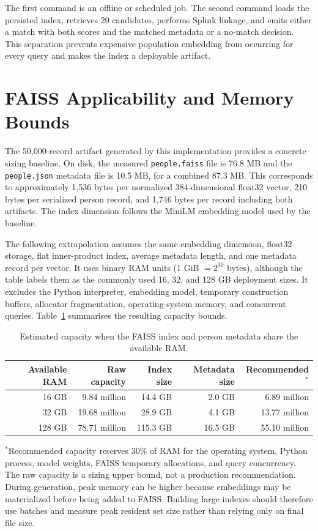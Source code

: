 \documentclass[conference]{IEEEtran}
\begin{document}
The first command is an offline or scheduled job. The second command loads the persisted index, retrieves 20 candidates, performs Splink linkage, and emits either a match with both scores and the matched metadata or a no-match decision. This separation prevents expensive population embedding from occurring for every query and makes the index a deployable artifact.

\section{FAISS Applicability and Memory Bounds}
The 50,000-record artifact generated by this implementation provides a concrete sizing baseline. On disk, the measured \texttt{people.faiss} file is 76.8 MB and the \texttt{people.json} metadata file is 10.5 MB, for a combined 87.3 MB. This corresponds to approximately 1,536 bytes per normalized 384-dimensional float32 vector, 210 bytes per serialized person record, and 1,746 bytes per record including both artifacts. The index dimension follows the MiniLM embedding model used by the baseline.

The following extrapolation assumes the same embedding dimension, float32 storage, flat inner-product index, average metadata length, and one metadata record per vector. It uses binary RAM units (1 GiB $=2^{30}$ bytes), although the table labels them as the commonly used 16, 32, and 128 GB deployment sizes. It excludes the Python interpreter, embedding model, temporary construction buffers, allocator fragmentation, operating-system memory, and concurrent queries. Table~\ref{tab:capacity} summarises the resulting capacity bounds.

\begin{table}[t]
\centering
\caption{Estimated capacity when the FAISS index and person metadata share the available RAM.}
\label{tab:capacity}
\begin{tabular}{rrrrr}
\toprule
Available RAM & Raw capacity & Index size & Metadata size & Recommended$^*$ \\
\midrule
16 GB & 9.84 million & 14.4 GB & 2.0 GB & 6.89 million \\
32 GB & 19.68 million & 28.9 GB & 4.1 GB & 13.77 million \\
128 GB & 78.71 million & 115.3 GB & 16.5 GB & 55.10 million \\
\bottomrule
\end{tabular}
\end{table}

\noindent
$^*$Recommended capacity reserves 30\% of RAM for the operating system, Python process, model weights, FAISS temporary allocations, and query concurrency. The raw capacity is a sizing upper bound, not a production recommendation. During generation, peak memory can be higher because embeddings may be materialized before being added to FAISS. Building large indexes should therefore use batches and measure peak resident set size rather than relying only on final file size.
\end{document}
